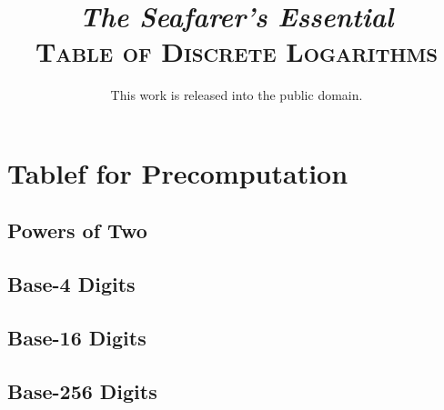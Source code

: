 \documentclass[8pt,a4paper]{extbook}
\title{
\emph{The Seafarer's Essential}\\
\textsc{Table of Discrete Logarithms}
}
\author{}
\date{This work is released into the public domain.}
\begin{document}
\maketitle
\tableofcontents

\chapter{Tablef for Precomputation}
\section{Powers of Two}


\clearpage
\section{Base-4 Digits}


\clearpage
\section{Base-16 Digits}


\clearpage
\section{Base-256 Digits}

\end{document}
